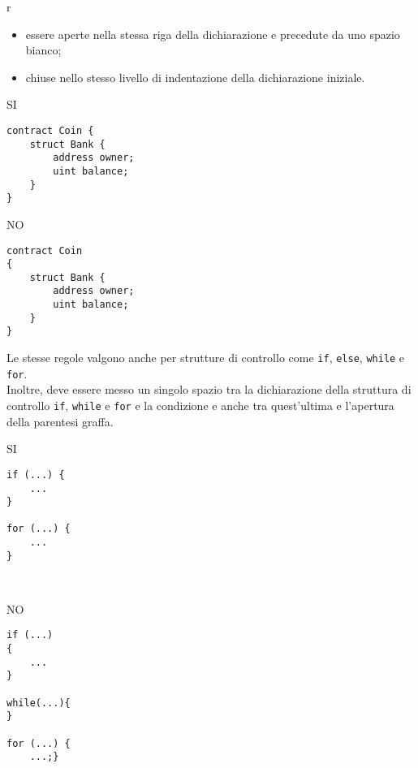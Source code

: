 r\documentclass[../ProcessiPrimari.tex]{subfiles}
\begin{document}
\begin{itemize}
\item essere aperte nella stessa riga della dichiarazione e precedute da uno spazio bianco;
\item chiuse nello stesso livello di indentazione della dichiarazione iniziale.
\end{itemize}
\begin{center}{
\begin{minipage}{5.5cm}
{\begin{center}SI\end{center}}
\begin{Verbatim}[frame=single]
contract Coin {
    struct Bank {
        address owner;
        uint balance;
    }
}

\end{Verbatim}
\end{minipage}
\hfil
\begin{minipage}{5.5cm}
{\begin{center}NO\end{center}}
\begin{Verbatim}[frame=single]
contract Coin
{
    struct Bank {
        address owner;
        uint balance;
    }
}
\end{Verbatim}
\end{minipage}
}
\end{center}
Le stesse regole valgono anche per strutture di controllo come \texttt{if}, \texttt{else}, \texttt{while} e \texttt{for}.\\
Inoltre, deve essere messo un singolo spazio tra la dichiarazione della struttura di controllo \texttt{if}, \texttt{while} e \texttt{for} e la condizione e anche tra quest'ultima e l'apertura della parentesi graffa.
\begin{center}{
\begin{minipage}{6cm}
{\begin{center}SI\end{center}}
\begin{Verbatim}[frame=single]
if (...) {
    ...
}

for (...) {
    ...
}



\end{Verbatim}
\end{minipage}
\hfil
\begin{minipage}{6cm}
{\begin{center}NO\end{center}}
\begin{Verbatim}[frame=single]
if (...)
{
    ...
}

while(...){
}

for (...) {
    ...;}
\end{Verbatim}
\end{minipage}
}
\end{center}
\end{document}
